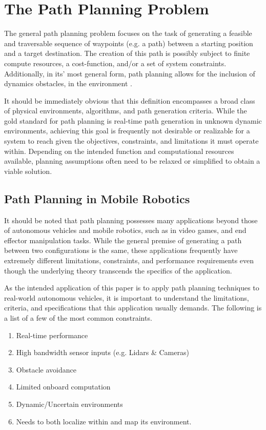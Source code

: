 \section{The Path Planning Problem} 
The general path planning problem focuses on the task of generating a feasible and traversable sequence of waypoints (e.g. a path) between a starting position and a target destination. The creation of this path is possibly subject to finite compute resources, a cost-function, and/or a set of system constraints. Additionally, in its' most general form, path planning allows for the inclusion of dynamics obstacles, in the environment \cite{Lav06}. 

It should be immediately obvious that this definition encompasses a broad class of physical environments, algorithms, and path generation criteria. While the gold standard for path planning is real-time path generation in unknown dynamic environments, achieving this goal is frequently not desirable or realizable for a system to reach given the objectives, constraints, and limitations it must operate within. Depending on the intended function and computational resources available, planning assumptions often need to be relaxed or simplified to obtain a viable solution.

\subsection{Path Planning in Mobile Robotics}
It should be noted that path planning possesses many applications beyond those of autonomous vehicles and mobile robotics, such as in video games, and end effector manipulation tasks. While the general premise of generating a path between two configurations is the same, these applications frequently have extremely different limitations, constraints, and performance requirements even though the underlying theory transcends the specifics of the application.

As the intended application of this paper is to apply path planning techniques to real-world autonomous vehicles, it is important to understand the limitations, criteria, and specifications that this application usually demands. The following is a list of a few of the most common constraints.


\begin{enumerate}
    \item Real-time performance 
    \item High bandwidth sensor inputs (e.g. Lidars \& Cameras)
    \item Obstacle avoidance 
    \item Limited onboard computation
    \item Dynamic/Uncertain environments
    \item Needs to both localize within and map its environment.
\end{enumerate}


